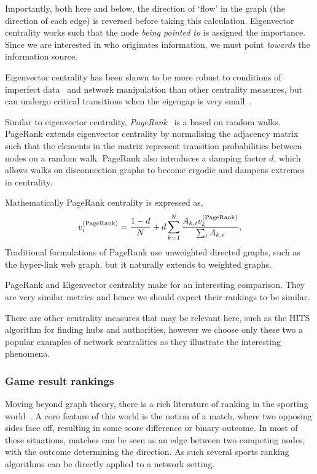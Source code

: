 Importantly, both here and below, the direction of `flow' in the graph (the direction of each edge) is reversed before taking this calculation. Eigenvector centrality works such that the node \emph{being pointed to} is assigned the importance. Since we are interested in who originates information, we must point \emph{towards} the information source.

Eigenvector centrality has been shown to be more robust to conditions of imperfect data~\cite{costenbader_stability_2003} and network manipulation \cite{niu_robustness_2015} than other centrality measures, but can undergo critical transitions when the eigengap is very small~\cite{south_centrality_2021}.

Similar to eigenvector centrality, \emph{PageRank}~\cite{brin_anatomy_1998,page_pagerank_1999} is a based on random walks. PageRank extends eigenvector centrality by normalising the adjacency matrix such that the elements in the matrix represent transition probabilities between nodes on a random walk. PageRank also introduces a damping factor $d$, which allows walks on disconnection graphs to become ergodic and dampens extremes in centrality.

Mathematically PageRank centrality is expressed as,
\begin{equation}
	v_i^{\rm (PageRank)}=\frac{1-d}{N}+d \sum_{k =1 }^{N} \frac{ A_{k,i} v_k^{\rm (PageRank)}}{\sum_i A_{k,i}},
\end{equation}
Traditional formulations of PageRank use unweighted directed graphs, such as the hyper-link web graph, but it naturally extends to weighted graphs.

PageRank and Eigenvector centrality make for an interesting comparison. They are very similar metrics and hence we should expect their rankings to be similar. 

There are other centrality measures that may be relevant here, such as the HITS algorithm for finding hubs and authorities, however we choose only these two a popular examples of network centralities as they illustrate the interesting phenomena.

\subsubsection{Game result rankings}

Moving beyond graph theory, there is a rich literature of ranking in the sporting world~\cite{langville_whos_2012}. A core feature of this world is the notion of a match, where two opposing sides face off, resulting in some score difference or binary outcome. In most of these situations, matches can be seen as an edge between two competing nodes, with the outcome determining the direction. As such several sports ranking algorithms can be directly applied to a network setting.

